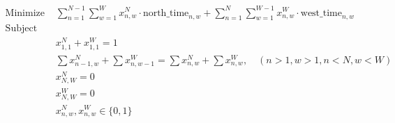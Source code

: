 \documentclass{article}
\begin{document}
\begin{align*}
    \text{Minimize } & \sum_{n=1}^{N-1} \sum_{w=1}^{W} x_{n,w}^N \cdot \text{north\_time}_{n,w} + \sum_{n=1}^{N} \sum_{w=1}^{W-1} x_{n,w}^W \cdot \text{west\_time}_{n,w} \\
    \text{Subject to: } & \\
    & x_{1,1}^N + x_{1,1}^W = 1 \\
    & \sum x_{n-1,w}^N + \sum x_{n,w-1}^W = \sum x_{n,w}^N + \sum x_{n,w}^W, \quad (n > 1, w > 1, n < N, w < W) \\
    & x_{N,W}^N = 0 \\
    & x_{N,W}^W = 0 \\
    & x_{n,w}^N, x_{n,w}^W \in \{0, 1\}
\end{align*}
\end{document}

